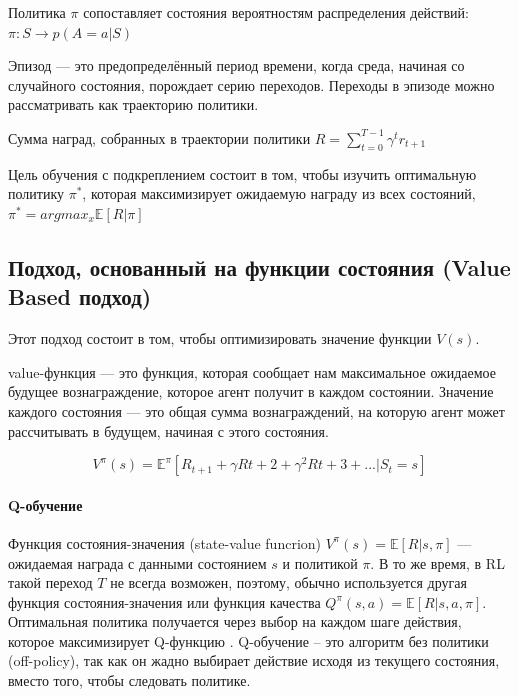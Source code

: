 Политика $\pi$ сопоставляет состояния вероятностям распределения действий: $\pi : S \to p(A = a|S)$

Эпизод --- это предопределённый период времени, когда среда, начиная со случайного состояния, порождает серию переходов. Переходы в эпизоде можно рассматривать как траекторию политики.

Сумма наград, собранных в траектории политики $R = \sum_{t=0}^{T-1} \gamma^t r_{t+1}$

Цель обучения с подкреплением состоит в том, чтобы изучить оптимальную политику ${\pi^*}$, которая максимизирует ожидаемую награду из всех состояний, $\pi^* = argmax_x \mathbb{E} [R|\pi]$ \cite{Otterlo2012ReinforcementLA}

\subsection{Подход, основанный на функции состояния (Value Based подход)}

Этот подход состоит в том, чтобы оптимизировать значение функции $V(s)$.

value-функция — это функция, которая сообщает нам максимальное ожидаемое будущее вознаграждение, которое агент получит в каждом состоянии. Значение каждого состояния — это общая сумма вознаграждений, на которую агент может рассчитывать в будущем, начиная с этого состояния.

\begin{equation} \label{eq:someEq}
V^\pi (s) = \mathbb{E}^\pi [R_{t+1} + \gamma R{t+2} + \gamma^2 R{t+3} + ... |S_t = s]
\end{equation}

\paragraph{Q-обучение}

Функция состояния-значения (state-value funcrion) $V^\pi (s) = \mathbb{E}[R|s, \pi]$ --- ожидаемая награда с данными состоянием $s$ и политикой $\pi$. В то же время, в RL такой переход $T$ не всегда возможен, поэтому, обычно используется другая функция состояния-значения или функция качества $Q^\pi(s,a) = \mathbb{E}[R|s, a, \pi]$. Оптимальная политика получается через выбор на каждом шаге действия, которое максимизирует Q-функцию \cite{SuttonAndBarto-RL-Introduction-p107}. Q-обучение -- это алгоритм без политики (off-policy), так как он жадно выбирает действие исходя из текущего состояния, вместо того, чтобы следовать политике.

